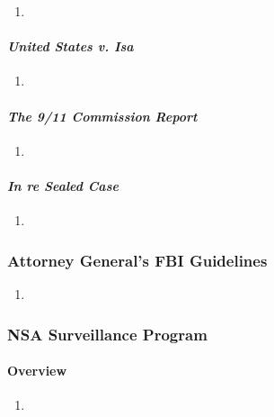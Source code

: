 \begin{enumerate}
    \item 
\end{enumerate}

\paragraph{\emph{United States v. Isa}} %

\begin{enumerate}
    \item 
\end{enumerate}

\paragraph{\emph{The 9/11 Commission Report}} %

\begin{enumerate}
    \item 
\end{enumerate}

\paragraph{\emph{In re Sealed Case}} %

\begin{enumerate}
    \item 
\end{enumerate}

\subsubsection{Attorney General's FBI Guidelines}

\begin{enumerate}
    \item %
\end{enumerate}

\subsubsection{NSA Surveillance Program}

\paragraph{Overview} %

\begin{enumerate}
    \item
\end{enumerate}


